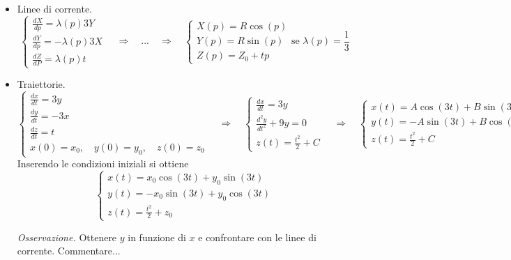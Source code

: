 \parttwo
\begin{itemize}
\item Linee di corrente.
\begin{equation}
 \begin{cases}
  \frac{dX}{dp} = \lambda(p) 3Y \\
  \frac{dY}{dp} = -\lambda(p) 3X \\
  \frac{dZ}{dP} = \lambda(p) t
 \end{cases}
 \quad\Rightarrow\quad
 ...
 \quad\Rightarrow\quad
 \begin{cases}
  X(p) = R \cos(p) \\
  Y(p) = R \sin(p) \\
  Z(p) = Z_0 + t p
 \end{cases} \text{se $\lambda(p) = \frac{1}{3}$}
\end{equation}

\item Traiettorie.
\begin{equation}
 \begin{cases}
  \frac{dx}{dt} = 3y \\
  \frac{dy}{dt} = -3x \\
  \frac{dz}{dt} = t \\
  x(0) = x_0 , \quad y(0) = y_0 , \quad z(0) = z_0
 \end{cases}
 \quad\Rightarrow\quad
 \begin{cases}
  \frac{dx}{dt} = 3y \\
  \frac{d^2y}{dt^2} + 9 y = 0 \\
  z(t) = \frac{t^2}{2} + C
 \end{cases}
 \quad\Rightarrow\quad
 \begin{cases}
  x(t) = A \cos(3t) + B \sin(3t) \\
  y(t) = - A \sin(3t) + B \cos(3t) \\
  z(t) = \frac{t^2}{2} + C
 \end{cases}
\end{equation}
Inserendo le condizioni iniziali si ottiene
\begin{equation}
 \begin{cases}
  x(t) = x_0 \cos(3t) + y_0 \sin(3t) \\
  y(t) = - x_0 \sin(3t) + y_0 \cos(3t) \\
  z(t) = \frac{t^2}{2} + z_0
 \end{cases}
\end{equation}

\textit{Osservazione.} Ottenere $y$ in funzione di $x$ e confrontare con le linee di corrente. Commentare...


\end{itemize}
